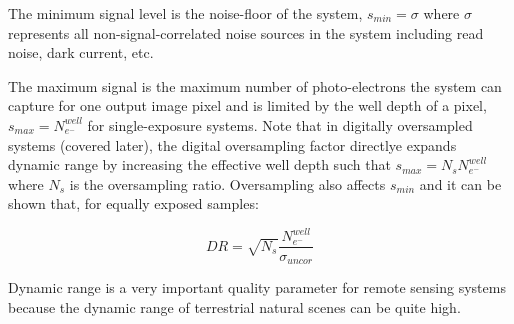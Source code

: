 \documentclass[10pt,journal]{IEEEtran}  %
\begin{document}
The minimum signal level is the noise-floor of the system, $s_{min} = \sigma$ where $\sigma$ represents all non-signal-correlated noise sources in the system including read noise, dark current, etc.

The maximum signal is the maximum number of photo-electrons the system can capture for one output image pixel and is limited by the well depth of a pixel, $s_{max} = N_{e^-}^{well}$ for single-exposure systems.  Note that in digitally oversampled systems (covered later), the digital oversampling factor directlye expands dynamic range by increasing the effective well depth such that $s_{max} = N_s N_{e^-}^{well}$ where $N_s$ is the oversampling ratio.  Oversampling also affects $s_{min}$ and it can be shown that, for equally exposed samples:

\begin{equation}
    DR = \sqrt{N_s}\frac{N_{e^-}^{well}}{\sigma_{uncor}}
\label{eq:DR_OS}
\end{equation}

Dynamic range is a very important quality parameter for remote sensing systems because the dynamic range of terrestrial natural scenes can be quite high.  
\end{document}
